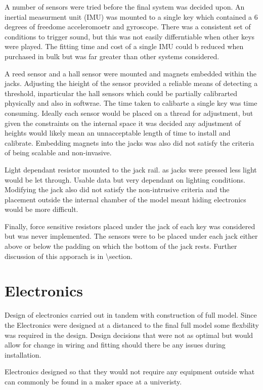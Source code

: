 A number of sensors were tried before the final system was decided upon.
An inertial measurment unit (IMU) was mounted to a single key which
contained a 6 degrees of freedome acceleromoetr and gyroscope. There was
a consistent set of conditions to trigger sound, but this was not easily
differntiable when other keys were played. The fitting time and cost of
a single IMU could b reduced when purchased in bulk but was far greater
than other systems considered.

A reed sensor and a hall sensor were mounted and magnets embedded within
the jacks. Adjusting the hieight of the sensor provided a reliable means
of detecting a threshold, inparticular the hall sensors which could be
partially calibrarted physically and also in softwrae. The time taken to
calibarte a single key was time consuming. Ideally each sensor would be
placed on a thread for adjustment, but given the constraints on the
internal space it was decided any adjustment of heights would likely
mean an unnacceptable length of time to install and calibrate. Embedding
magnets into the jacks was also did not satisfy the criteria of being
scalable and non-invasive.

Light dependant resistor mounted to the jack rail. as jacks were pressed
less light would be let through. Usable data but very dependant on
lighting conditions. Modifying the jack also did not satisfy the
non-intrusive criteria and the placement outside the internal chamber of
the model meant hiding electronics would be more difficult.

Finally, force sensitive resistors placed under the jack of each key was
considered but was never implemented. The sensors were to be placed
under each jack either above or below the padding on which the bottom of
the jack rests. Further discussion of this apporach is in
\textbackslash section.

\section{Electronics}\label{electronics}

Design of electronics carried out in tandem with construction of full
model. Since the Electronics were designed at a distanced to the final
full model some flexbility was required in the design. Design decisions
that were not as optimal but would allow for change in wiring and
fitting should there be any issues during installation.

Electronics designed so that they would not require any equipment
outside what can commonly be found in a maker space at a univeristy.

